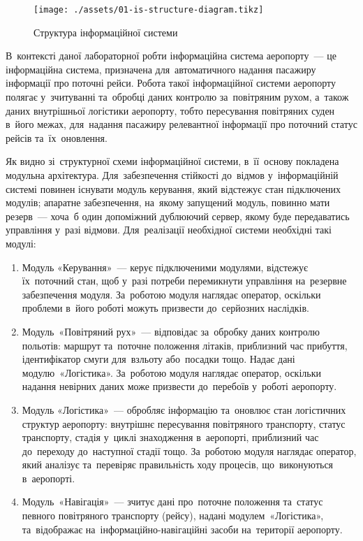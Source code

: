 \documentclass[
	a4paper,
	oneside,
	DIV = 12,
	12pt,
	headings = normal,
]{scrartcl}
\begin{document}
		\begin{figure}[!htbp]
			\centering
			\texttt{[image: ./assets/01-is-structure-diagram.tikz]}
			\caption{Структура інформаційної системи}
			\label{fig:01-is-structure-diagram}
		\end{figure}

		В~контексті даної лабораторної робти інформаційна система аеропорту~— це інформаційна система, призначена для~автоматичного надання пасажиру інформації про поточні рейси. Робота такої інформаційної системи аеропорту полягає у~зчитуванні та~обробці даних контролю за~повітряним рухом, а~також даних внутрішньої логістики аеропорту, тобто пересування повітряних суден в~його межах, для~надання пасажиру релевантної інформації про поточний статус рейсів та~їх~оновлення. 

		Як видно зі~структурної схеми інформаційної системи, в~її~основу покладена модульна архітектура. Для~забезпечення стійкості до~відмов у~інформаційній системі повинен існувати модуль керування, який відстежує стан підключених модулів; апаратне забезпечення, на~якому запущений модуль, повинно мати резерв~— хоча~б один допоміжний дублюючий сервер, якому буде передаватись управління у~разі відмови. Для~реалізації необхідної системи необхідні такі модулі:
		\begin{enumerate}
			\item Модуль «Керування»~— керує підключеними модулями, відстежує їх~поточний стан, щоб у~разі потреби перемикнути управління на~резервне забезпечення модуля. За~роботою модуля наглядає оператор, оскільки проблеми в~його роботі можуть призвести до~серйозних наслідків.
			\item Модуль~«Повітряний рух»~— відповідає за~обробку даних контролю польотів: маршрут та~поточне положення літаків, приблизний час прибуття, ідентифікатор смуги для~взльоту або~посадки тощо. Надає дані модулю~«Логістика». За~роботою модуля наглядає оператор, оскільки надання невірних даних може призвести до~перебоїв у~роботі аеропорту.
			\item Модуль «Логістика»~— обробляє інформацію та~оновлює стан логістичних структур аеропорту: внутрішнє пересування повітряного транспорту, статус транспорту, стадія у~циклі знаходження в~аеропорті, приблизний час до~переходу до~наступної стадії тощо. За~роботою модуля наглядає оператор, який аналізує та~перевіряє правильність ходу процесів, що~виконуються в~аеропорті.
			\item Модуль~«Навігація»~— зчитує дані про~поточне положення та~статус певного повітряного транспорту (рейсу), надані модулем~«Логістика», та~відображає на~інформаційно-навігаційні засоби на~території аеропорту.
		\end{enumerate}
\end{document}
